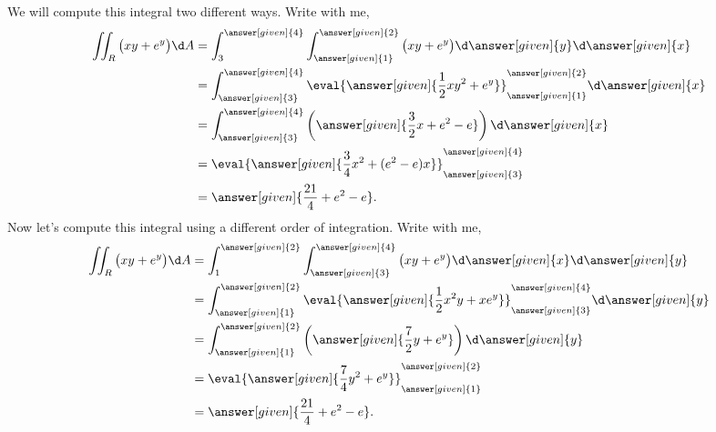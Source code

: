 \documentclass{ximera}
\begin{document}
\begin{example}
\begin{image}
  \end{image}
  \begin{explanation}
    We will compute this integral two different ways. Write with me,
    \begin{align*}
      \iint_R \big(xy+e^y\big) \d A &= \int_3^{\answer[given]{4}}\int_{\answer[given]{1}}^{\answer[given]{2}}\big(xy+e^y\big) \d \answer[given]{y} \d \answer[given]{x}\\
      &= \int_{\answer[given]{3}}^{\answer[given]{4}} \eval{\answer[given]{\frac{1}{2}xy^2+e^y}}_{\answer[given]{1}}^{\answer[given]{2}} \d \answer[given]{x} \\
      &= \int_{\answer[given]{3}}^{\answer[given]{4}}\left(\answer[given]{\frac{3}{2}x + e^2-e}\right)\d \answer[given]{x} \\
      &= \eval{\answer[given]{\frac{3}{4}x^2 + (e^2-e)x}}_{\answer[given]{3}}^{\answer[given]{4}} \\
      &= \answer[given]{\frac{21}{4}+ e^2-e}.
    \end{align*}
  Now let's compute this integral using a different order of
  integration. Write with me,
  \begin{align*}
    \iint_R\big(xy+e^y\big) \d A &= \int_1^{\answer[given]{2}}\int_{\answer[given]{3}}^{\answer[given]{4}}\big(xy+e^y\big)\d \answer[given]{x} \d \answer[given]{y} \\
    &= \int_{\answer[given]{1}}^{\answer[given]{2}}\eval{\answer[given]{\frac{1}{2}x^2y+xe^y}}_{\answer[given]{3}}^{\answer[given]{4}}\d \answer[given]{y}\\
    &= \int_{\answer[given]{1}}^{\answer[given]{2}}\left(\answer[given]{\frac{7}{2}y+e^y}\right)\d \answer[given]{y}\\
    &= \eval{\answer[given]{\frac{7}{4}y^2+e^y}}_{\answer[given]{1}}^{\answer[given]{2}}\\
    &=\answer[given]{\frac{21}{4}+e^2-e}.
  \end{align*}
  \end{explanation}
\end{example}
\end{document}
